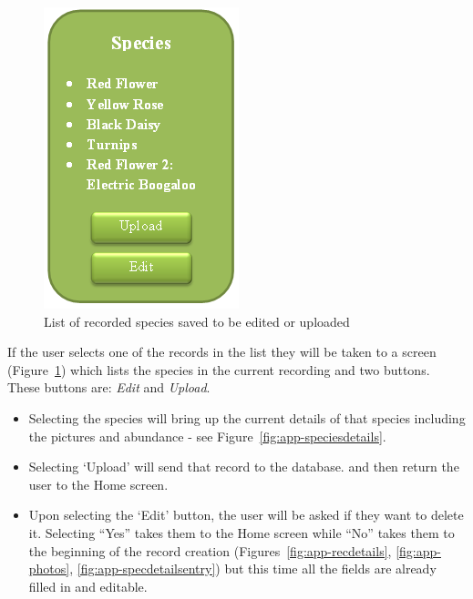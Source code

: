 \documentclass[12pt]{article}
\begin{document}
		\begin{figure}[H]
			\begin{center}
				\includegraphics[scale=0.7]{app-SpeciesList}
			\end{center}
			\caption{List of recorded species saved to be edited or uploaded}
			\label{fig:app-specieslist}
		\end{figure}

		If the user selects one of the records in the list they will be taken to a screen (Figure~\ref{fig:app-specieslist}) which lists the species in the current recording and two buttons.
		These buttons are: \textit{Edit} and \textit{Upload}.
		\begin{itemize}
			\item Selecting the species will bring up the current details of that species including the pictures and abundance - see Figure~\ref{fig:app-speciesdetails}.
			\item Selecting `Upload' will send that record to the database. and then return the user to the Home screen.
			\item Upon selecting the `Edit' button, the user will be asked if they want to delete it. Selecting ``Yes'' takes them to the Home screen while ``No'' takes them to the beginning of the record creation (Figures~\ref{fig:app-recdetails}, \ref{fig:app-photos}, \ref{fig:app-specdetailsentry}) but this time all the fields are already filled in and editable.
		\end{itemize}
\end{document}
